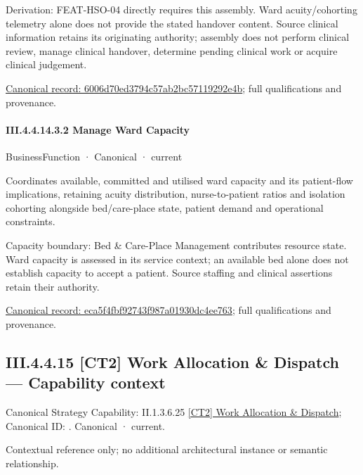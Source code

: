 Derivation: FEAT-HSO-04 directly requires this assembly. Ward acuity/cohorting telemetry alone does not provide the stated handover content. Source clinical information retains its originating authority; assembly does not perform clinical review, manage clinical handover, determine pending clinical work or acquire clinical judgement.


{\footnotesize \href{../../../../continuum/business/business-function/6006d70ed3794c57ab2bc57119292e4b.md}{Canonical record: 6006d70ed3794c57ab2bc57119292e4b}; full qualifications and provenance.}\par
\paragraph*{III.4.4.14.3.2 Manage Ward Capacity}
\label{navigation:III.4.4.14.3.2}

\label{element:eca5f4fbf92743f987a01930dc4ee763}
{\small BusinessFunction · Canonical · current}\par

Coordinates available, committed and utilised ward capacity and its patient-flow implications, retaining acuity distribution, nurse-to-patient ratios and isolation cohorting alongside bed/care-place state, patient demand and operational constraints.



Capacity boundary: Bed \& Care-Place Management contributes resource state. Ward capacity is assessed in its service context; an available bed alone does not establish capacity to accept a patient. Source staffing and clinical assertions retain their authority.


{\footnotesize \href{../../../../continuum/business/business-function/eca5f4fbf92743f987a01930dc4ee763.md}{Canonical record: eca5f4fbf92743f987a01930dc4ee763}; full qualifications and provenance.}\par
\subsection*{III.4.4.15 [CT2] Work Allocation \& Dispatch — Capability context}
\label{navigation:III.4.4.15}

{\small Canonical Strategy Capability: II.1.3.6.25 \hyperref[element:152a5252952c405994e9b171234efcb0]{[CT2] Work Allocation \& Dispatch}; Canonical ID: \texttt{}. Canonical · current.}\par
Contextual reference only; no additional architectural instance or semantic relationship.\par
